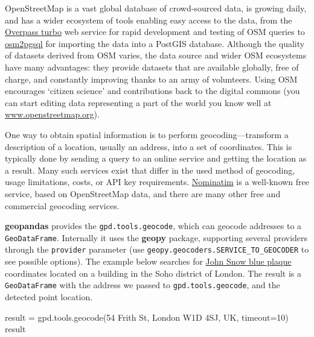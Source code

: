 \documentclass[
  letterpaper,
]{krantz}
\newenvironment{Shaded}{\begin{snugshade}}{\end{snugshade}}
\newcommand{\DecValTok}[1]{\textcolor[rgb]{0.68,0.00,0.00}{#1}}
\newcommand{\NormalTok}[1]{\textcolor[rgb]{0.00,0.23,0.31}{#1}}
\newcommand{\OperatorTok}[1]{\textcolor[rgb]{0.37,0.37,0.37}{#1}}
\newcommand{\StringTok}[1]{\textcolor[rgb]{0.13,0.47,0.30}{#1}}
\begin{document}
OpenStreetMap is a vast global database of crowd-sourced data, is
growing daily, and has a wider ecosystem of tools enabling easy access
to the data, from the \href{https://overpass-turbo.eu/}{Overpass turbo}
web service for rapid development and testing of OSM queries to
\href{https://osm2pgsql.org/}{osm2pgsql} for importing the data into a
PostGIS database. Although the quality of datasets derived from OSM
varies, the data source and wider OSM ecosystems have many advantages:
they provide datasets that are available globally, free of charge, and
constantly improving thanks to an army of volunteers. Using OSM
encourages `citizen science' and contributions back to the digital
commons (you can start editing data representing a part of the world you
know well at
\href{https://www.openstreetmap.org/}{www.openstreetmap.org}).

One way to obtain spatial information is to perform
geocoding---transform a description of a location, usually an address,
into a set of coordinates. This is typically done by sending a query to
an online service and getting the location as a result. Many such
services exist that differ in the used method of geocoding, usage
limitations, costs, or API key requirements.
\href{https://nominatim.openstreetmap.org/ui/about.html}{Nominatim} is a
well-known free service, based on OpenStreetMap data, and there are many
other free and commercial geocoding services.

\textbf{geopandas} provides the \texttt{gpd.tools.geocode}, which can
geocode addresses to a \texttt{GeoDataFrame}. Internally it uses the
\textbf{geopy} package, supporting several providers through the
\texttt{provider} parameter (use
\texttt{geopy.geocoders.SERVICE\_TO\_GEOCODER} to see possible options).
The example below searches for
\href{https://en.m.wikipedia.org/wiki/John_Snow_(public_house)}{John
Snow blue plaque} coordinates located on a building in the Soho district
of London. The result is a \texttt{GeoDataFrame} with the address we
passed to \texttt{gpd.tools.geocode}, and the detected point location.

\begin{Shaded}
\begin{Highlighting}[]
\NormalTok{result }\OperatorTok{=}\NormalTok{ gpd.tools.geocode(}\StringTok{\textquotesingle{}54 Frith St, London W1D 4SJ, UK\textquotesingle{}}\NormalTok{, timeout}\OperatorTok{=}\DecValTok{10}\NormalTok{)}
\NormalTok{result}
\end{Highlighting}
\end{Shaded}
\end{document}
